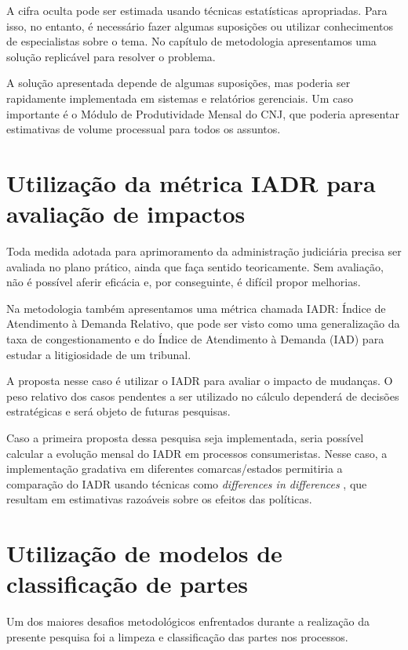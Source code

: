 \documentclass[]{report}
\begin{document}
A cifra oculta pode ser estimada usando técnicas estatísticas
apropriadas. Para isso, no entanto, é necessário fazer algumas
suposições ou utilizar conhecimentos de especialistas sobre o tema. No
capítulo de metodologia apresentamos uma solução replicável para
resolver o problema.

A solução apresentada depende de algumas suposições, mas poderia ser
rapidamente implementada em sistemas e relatórios gerenciais. Um caso
importante é o Módulo de Produtividade Mensal do CNJ, que poderia
apresentar estimativas de volume processual para todos os assuntos.

\section{Utilização da métrica IADR para avaliação de
impactos}\label{utilizacao-da-metrica-iadr-para-avaliacao-de-impactos-das-medidas}

Toda medida adotada para aprimoramento da administração judiciária
precisa ser avaliada no plano prático, ainda que faça sentido
teoricamente. Sem avaliação, não é possível aferir eficácia e, por
conseguinte, é difícil propor melhorias.

Na metodologia também apresentamos uma métrica chamada IADR: Índice de
Atendimento à Demanda Relativo, que pode ser visto como uma
generalização da taxa de congestionamento e do Índice de Atendimento à
Demanda (IAD) para estudar a litigiosidade de um tribunal.

A proposta nesse caso é utilizar o IADR para avaliar o impacto de
mudanças. O peso relativo dos casos pendentes a ser utilizado no cálculo
dependerá de decisões estratégicas e será objeto de futuras pesquisas.

Caso a primeira proposta dessa pesquisa seja implementada, seria
possível calcular a evolução mensal do IADR em processos consumeristas.
Nesse caso, a implementação gradativa em diferentes comarcas/estados
permitiria a comparação do IADR usando técnicas como \emph{differences
in differences} \citep{bertrand2004much}, que resultam em estimativas
razoáveis sobre os efeitos das políticas.

\section{Utilização de modelos de classificação de
partes}\label{utilizacao-de-modelos-de-classificacao-de-partes}

Um dos maiores desafios metodológicos enfrentados durante a realização
da presente pesquisa foi a limpeza e classificação das partes nos
processos.
\end{document}
